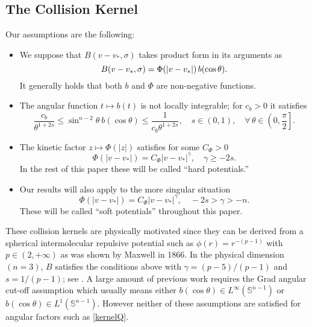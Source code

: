 \documentclass{amsart}
\numberwithin{equation}{section}
\begin{document}
\subsection*{The Collision Kernel}

Our assumptions are the following:
 \begin{itemize}
 \item 
We suppose that $B(v-v_*, \sigma)$ takes product form in its arguments as
\begin{equation}
B(v-v_*, \sigma) =\Phi( |v-v_*| ) \, b(\cos \theta).
\notag
\end{equation}
It generally holds that both $b$ and $\Phi$ are non-negative functions. 
 
  \item The angular function $t \mapsto b(t)$ is not locally integrable; for $c_b >0$ it satisfies
\begin{equation}
\frac{c_b}{\theta^{1+2s}} 
\le 
\sin^{{n} -2} \theta  ~ b(\cos \theta) 
\le 
\frac{1}{c_b\theta^{1+2s}},
\quad
s \in (0,1),
\quad
   \forall \, \theta \in \left(0,\frac{\pi}{2} \right].
   \label{kernelQ}
\end{equation}
 
  \item The kinetic factor $z \mapsto \Phi(|z|)$ satisfies for some $C_\Phi >0$
\begin{equation}
\Phi( |v-v_*| ) =  C_\Phi  |v-v_*|^\gamma , \quad \gamma  \ge -2s.
\label{kernelP}
\end{equation}
In the rest of this paper these will be called ``hard potentials.'' 

  \item Our results will also apply to the more singular situation
\begin{equation}
\Phi( |v-v_*| ) =  C_\Phi  |v-v_*|^\gamma , \quad  -2s > \gamma  > -n. 
\label{kernelPsing}
\end{equation}
These will be called ``soft potentials'' throughout this paper.

 \end{itemize}
 
These collision kernels are physically motivated since they can be derived from a spherical intermolecular repulsive potential such as 
$
\phi(r)=r^{-(p-1)}
$
with $p \in (2,+\infty)$ as was shown by Maxwell in 1866.  In the physical dimension $(n=3)$,  $B$ satisfies the conditions above with $\gamma = (p-5)/(p-1)$ and $s = 1/(p-1)$;  see \cite{MR1942465}.  A large amount of previous work requires the Grad angular cut-off assumption which usually means 
 either $b(\cos\theta) \in L^\infty({{\mathbb S}^{{n}-1}})$ or $b(\cos\theta) \in L^1({{\mathbb S}^{{n}-1}})$.  However neither of these assumptions are satisfied for angular factors such as \eqref{kernelQ}.
 
\end{document}
